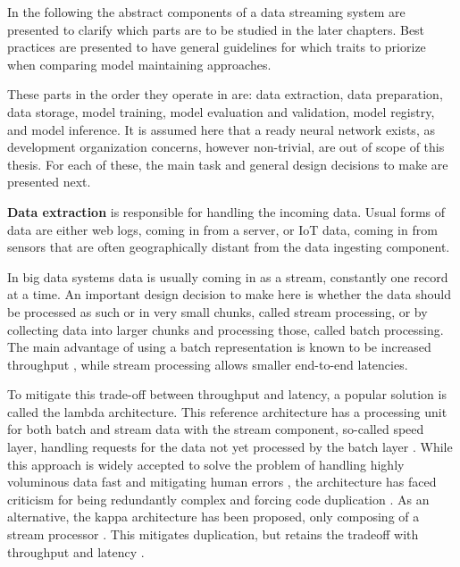 In the following the abstract components of a data streaming system are presented to clarify which parts are to be studied in the later chapters. Best practices are presented to have general guidelines for which traits to priorize when comparing model maintaining approaches.

These parts in the order they operate in are: data extraction, data preparation, data storage, model training, model evaluation and validation, model registry, and model inference. It is assumed here that a ready neural network exists, as development organization concerns, however non-trivial, are out of scope of this thesis. For each of these, the main task and general design decisions to make are presented next.

\textbf{Data extraction} is responsible for handling the incoming data. Usual forms of data are either web logs, coming in from a server, or IoT data, coming in from sensors that are often geographically distant from the data ingesting component.

In big data systems data is usually coming in as a stream, constantly one record at a time. An important design decision to make here is whether the data should be processed as such or in very small chunks, called stream processing, or by collecting data into  larger chunks and processing those, called batch processing. The main advantage of using a batch representation is known to be increased throughput%
, while stream processing allows smaller end-to-end latencies. %

To mitigate this trade-off between throughput and latency, a popular solution is called the lambda architecture. This reference architecture has a processing unit for both batch and stream data with the stream component, so-called speed layer, handling requests for the data not yet processed by the batch layer \cite{beatingcap}. While this approach is widely accepted to solve the problem of handling highly voluminous data fast and mitigating human errors \cite{lambdakappa}, the architecture has faced criticism for being redundantly complex and forcing code duplication \cite{questioninglambda} \cite{uber} \cite{facebook}. As an alternative, the kappa architecture has been proposed, only composing of a stream processor \cite{questioninglambda}. This mitigates duplication, but retains the tradeoff with throughput and latency \cite{lambdakappa}.

